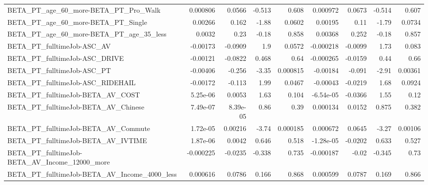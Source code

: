 \begin{tabular}{lrrrrrrrr}
BETA\_PT\_age\_60\_more-BETA\_PT\_Pro\_Walk               &    0.000806 &       0.0566 &   -0.513 &    0.608 &   0.000972 &      0.0673 &       -0.514 &         0.607 \\
BETA\_PT\_age\_60\_more-BETA\_PT\_Single                 &     0.00266 &        0.162 &    -1.88 &   0.0602 &    0.00195 &        0.11 &        -1.79 &        0.0734 \\
BETA\_PT\_age\_60\_more-BETA\_PT\_age\_35\_less            &      0.0032 &         0.23 &    -0.18 &    0.858 &    0.00368 &       0.252 &        -0.18 &         0.857 \\
BETA\_PT\_fulltimeJob-ASC\_AV                         &    -0.00173 &      -0.0909 &      1.9 &   0.0572 &  -0.000218 &     -0.0099 &         1.73 &         0.083 \\
BETA\_PT\_fulltimeJob-ASC\_DRIVE                      &    -0.00121 &      -0.0822 &    0.468 &     0.64 &  -0.000265 &     -0.0159 &         0.44 &          0.66 \\
BETA\_PT\_fulltimeJob-ASC\_PT                         &    -0.00406 &       -0.256 &    -3.35 & 0.000815 &   -0.00184 &      -0.091 &        -2.91 &       0.00361 \\
BETA\_PT\_fulltimeJob-ASC\_RIDEHAIL                   &    -0.00172 &       -0.113 &     1.99 &   0.0467 &   -0.00043 &     -0.0219 &         1.68 &        0.0924 \\
BETA\_PT\_fulltimeJob-BETA\_AV\_COST                   &    5.25e-06 &       0.0053 &     1.63 &    0.104 &  -6.54e-05 &     -0.0366 &         1.55 &          0.12 \\
BETA\_PT\_fulltimeJob-BETA\_AV\_Chinese                &    7.49e-07 &     8.39e-05 &     0.86 &     0.39 &   0.000134 &      0.0152 &        0.875 &         0.382 \\
BETA\_PT\_fulltimeJob-BETA\_AV\_Commute                &    1.72e-05 &      0.00216 &    -3.74 & 0.000185 &   0.000672 &      0.0645 &        -3.27 &       0.00106 \\
BETA\_PT\_fulltimeJob-BETA\_AV\_IVTIME                 &    1.87e-06 &       0.0042 &    0.646 &    0.518 &  -1.28e-05 &     -0.0202 &        0.633 &         0.527 \\
BETA\_PT\_fulltimeJob-BETA\_AV\_Income\_12000\_more      &   -0.000225 &      -0.0235 &   -0.338 &    0.735 &  -0.000187 &       -0.02 &       -0.345 &          0.73 \\
BETA\_PT\_fulltimeJob-BETA\_AV\_Income\_4000\_less       &    0.000616 &       0.0786 &    0.166 &    0.868 &   0.000599 &      0.0787 &        0.169 &         0.866 \\

\end{tabular}
